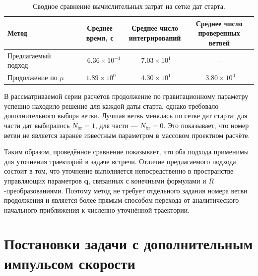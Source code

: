 \begin{table}[ht]
	\centering
	\caption{Сводное сравнение вычислительных затрат на сетке дат старта.}
	\label{tab:ch4_date_sweep_speed}
	\begin{tabular}{@{}lccc@{}}
		\toprule
		Метод
		& \shortstack{Среднее\\время, с}
		& \shortstack{Среднее число\\интегрирований}
		& \shortstack{Среднее число\\проверенных ветвей} \\
		\midrule
		Предлагаемый подход & \(\phantom{-}6.36\times10^{-1}\) & \(\phantom{-}7.03\times10^{1\phantom{-}}\) & -- \\
		Продолжение по \(\mu\) & \(\phantom{-}1.89\times10^{0\phantom{-}}\) & \(\phantom{-}4.30\times10^{1\phantom{-}}\) & \(\phantom{-}3.80\times10^{0\phantom{-}}\) \\
		\bottomrule
	\end{tabular}
\end{table}

В рассматриваемой серии расчётов продолжение по гравитационному параметру успешно находило решение для каждой даты старта, однако требовало дополнительного выбора ветви. Лучшая ветвь менялась по сетке дат старта: для части дат выбиралось \(N_{\mathrm{br}}=1\), для части --- \(N_{\mathrm{br}}=0\). Это показывает, что номер ветви не является заранее известным параметром в массовом проектном расчёте.

Таким образом, проведённое сравнение показывает, что оба подхода применимы для уточнения траекторий в задаче встречи. Отличие предлагаемого подхода состоит в том, что уточнение выполняется непосредственно в пространстве управляющих параметров \(\mathbf q\), связанных с конечными формулами и \(R\)-преобразованиями. Поэтому метод не требует отдельного задания номера ветви продолжения и является более прямым способом перехода от аналитического начального приближения к численно уточнённой траектории.


\section[Постановки задачи с дополнительным импульсом скорости]{\texorpdfstring{Постановки задачи с дополнительным импульсом скорости}{Постановки задачи с дополнительным импульсом скорости}}
\label{sec:ch4_nonzero_departure_velocity}

